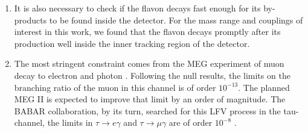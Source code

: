 \documentclass[prd,amsfonts,onecolumn,superscriptaddress,aps,nofootinbib,11pt]{revtex4-1}
\begin{document}
\begin{enumerate}

 

 \item It is also necessary to check if the flavon decays fast enough for its by-products to be found inside the detector. For the mass range and couplings of interest in this work, we found that the flavon decays promptly after its production well inside the inner tracking region of the detector.



\item The most stringent constraint comes from the MEG experiment of muon decay to electron and photon \cite{https://doi.org/10.48550/arxiv.1605.05081}. Following the null results,  the limits on the branching ratio of the muon in this channel is of order $10^{-13}$. The planned MEG II is expected to improve that limit by an order of magnitude. The BABAR collaboration, by its turn, searched for this LFV process in the tau-channel, the limits in $\tau \rightarrow e \gamma$ and $\tau \rightarrow \mu\gamma$ are of order $10^{-8}$ \cite{BaBar:2009hkt}. 

\end{enumerate}
\end{document}
